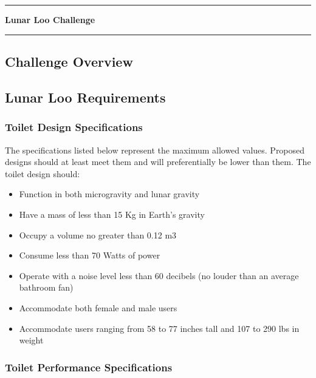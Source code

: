 \pagebreak
\chapter[Lunar Loo Challenge]{}\vspace{-2cm}\noindent\rule{\textwidth}{2.5pt}
\thispagestyle{empty}

\vspace{5cm}\textbf{\huge{Lunar Loo Challenge}}

\medskip\noindent\rule{\textwidth}{1pt}

\lipsum[1]

\pagebreak

\section{Challenge Overview}


\section{Lunar Loo Requirements}

    \subsection{Toilet Design Specifications}

    The specifications listed below represent the maximum allowed values.  Proposed designs should at least meet them and will preferentially be lower than them.  The toilet design should:

    \begin{itemize}
        \item Function in both microgravity and lunar gravity
        \item Have a mass of less than 15 Kg in Earth’s gravity
        \item Occupy a volume no greater than 0.12 m3
        \item Consume less than 70 Watts of power
        \item Operate with a noise level less than 60 decibels (no louder than an average bathroom fan)
        \item Accommodate both female and male users
        \item Accommodate users ranging from 58 to 77 inches tall and 107 to 290 lbs in weight
    \end{itemize}
    
    \subsection{Toilet Performance Specifications}

